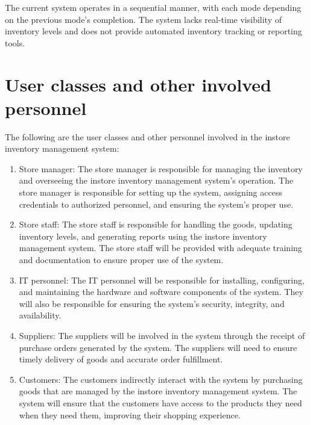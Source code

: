 The current system operates in a sequential manner, with each mode depending on the previous mode's completion. The system lacks real-time visibility of inventory levels and does not provide automated inventory tracking or reporting tools.

\section{User classes and other involved personnel \label{Section::Userclassesandotherinvolvedpersonnel}}
The following are the user classes and other personnel involved in the instore inventory management system:

\begin{enumerate}

    \item Store manager: The store manager is responsible for managing the inventory and overseeing the instore inventory management system's operation. The store manager is responsible for setting up the system, assigning access credentials to authorized personnel, and ensuring the system's proper use.


    \item Store staff: The store staff is responsible for handling the goods, updating inventory levels, and generating reports using the instore inventory management system. The store staff will be provided with adequate training and documentation to ensure proper use of the system.

    \item IT personnel: The IT personnel will be responsible for    installing, configuring, and maintaining the hardware and software components of the system. They will also be responsible for ensuring the system's security, integrity, and availability.

    \item Suppliers: The suppliers will be involved in the system through the receipt of purchase orders generated by the system. The suppliers will need to ensure timely delivery of goods and accurate order fulfillment.

    \item Customers: The customers indirectly interact with the system by purchasing goods that are managed by the instore inventory management system. The system will ensure that the customers have access to the products they need when they need them, improving their shopping experience.
    
\end{enumerate}

